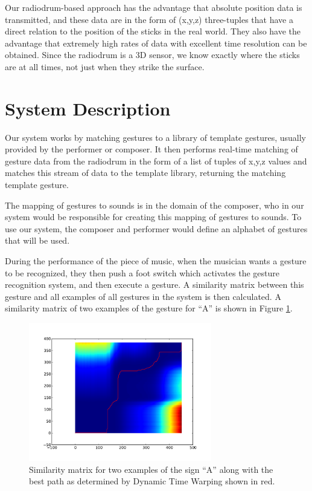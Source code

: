 \documentclass[twoside,10pt,a4paper]{article}
\begin{document}
Our radiodrum-based approach has the advantage that absolute position
data is transmitted, and these data are in the form of (x,y,z)
three-tuples that have a direct relation to the position of the sticks
in the real world. They also have the advantage that extremely high
rates of data with excellent time resolution can be obtained.  Since
the radiodrum is a 3D sensor, we know exactly where the sticks are at
all times, not just when they strike the surface.


\section{System Description}

Our system works by matching gestures to a library of template
gestures, usually provided by the performer or composer.  It then
performs real-time matching of gesture data from the radiodrum in the
form of a list of tuples of x,y,z values and matches this stream of
data to the template library, returning the matching template gesture.

The mapping of gestures to sounds is in the domain of the composer,
who in our system would be responsible for creating this mapping of
gestures to sounds. To use our system, the composer and performer
would define an alphabet of gestures that will be used.

During the performance of the piece of music, when the musician wants
a gesture to be recognized, they then push a foot switch which
activates the gesture recognition system, and then execute a gesture.
A similarity matrix between this gesture and all examples of all
gestures in the system is then calculated.  A similarity matrix of two
examples of the gesture for ``A'' is shown in Figure \ref{fig:a0-a1}.

\begin{figure}[htb]
\begin{center}
\includegraphics[width=80mm]{a0-a1}
\end{center}
\caption{
Similarity matrix for two examples of the sign ``A'' along with the
best path as determined by Dynamic Time Warping shown in red.}
\label{fig:a0-a1} 
\end{figure} 
\end{document}
